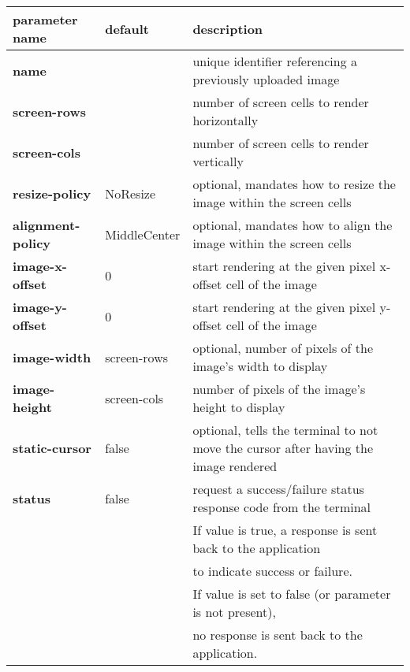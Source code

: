 \documentclass[a4paper]{article}
\begin{document}
\begin{tabular}{|l|l|l|}
    \hline
    \textbf{parameter name} & \textbf{default} & \textbf{description} \\
    \hline
    \textbf{name} &           & unique identifier referencing a previously uploaded image \\
    \textbf{screen-rows} &    & number of screen cells to render horizontally \\
    \textbf{screen-cols} &    & number of screen cells to render vertically \\
    \textbf{resize-policy} & NoResize & optional, mandates how to resize the image within the screen cells \\
    \textbf{alignment-policy} & MiddleCenter & optional, mandates how to align the image within the screen cells \\
    \textbf{image-x-offset} & 0 & start rendering at the given pixel x-offset cell of the image \\
    \textbf{image-y-offset} & 0 & start rendering at the given pixel y-offset cell of the image \\
    \textbf{image-width}    & screen-rows & optional, number of pixels of the image's width to display \\
    \textbf{image-height}   & screen-cols & number of pixels of the image's height to display \\
    \textbf{static-cursor}  & false & optional, tells the terminal to not move the cursor after having the image rendered \\
    \textbf{status}         & false & request a success/failure status response code from the terminal \\
        & & If value is true, a response is sent back to the application \\
        & & to indicate success or failure. \\
        & & If value is set to false (or parameter is not present), \\
        & & no response is sent back to the application. \\
    \hline
\end{tabular}

\end{document}
